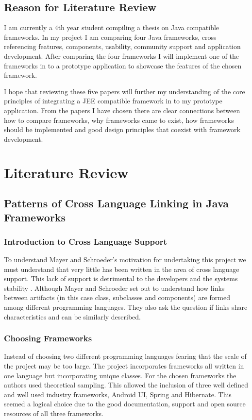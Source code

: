 \documentclass{article}
\begin{document}
	\subsection{Reason for Literature Review}
	I am currently a 4th year student compiling a thesis on Java compatible frameworks. In my project I am comparing four Java frameworks, cross referencing features, components, usability, community support and application development. After comparing the four frameworks I will implement one of the frameworks in to a prototype application to showcase the features of the chosen framework. 
	
	I hope that reviewing these five papers will further my understanding of the core principles of integrating a JEE compatible framework in to my prototype application. From the papers I have chosen there are clear connections between how to compare frameworks, why frameworks came to exist, how frameworks should be implemented and good design principles that coexist with framework development.

\newpage


\section{Literature Review}

	\subsection{Patterns of Cross Language Linking in Java Frameworks}
	
		\subsubsection{Introduction to Cross Language Support}
		To understand Mayer and Schroeder’s motivation for undertaking this project we must understand that very little has been written in the area of cross language support. This lack of support is detrimental to the developers and the systems stability \cite{crosslanguagecodeanalysis}\cite{tamingofconfusion}. Although Mayer and Schroeder set out to understand how links between artifacts (in this case class, subclasses and components) are formed among different programming languages. They also ask the question if links share characteristics and can be similarly described.

		\subsubsection{Choosing Frameworks}
		Instead of choosing two different programming languages fearing that the scale of the project may be too large. The project incorporates frameworks all written in one language but incorporating unique classes. For the chosen frameworks the authors used theoretical sampling. This allowed the inclusion of three well defined and well used industry frameworks, Android UI, Spring and Hibernate. This seemed a logical choice due to the good documentation, support and open source resources of all three frameworks.
\end{document}
